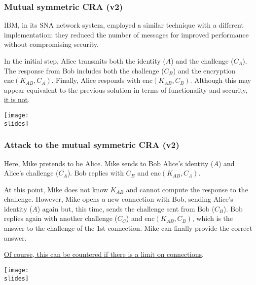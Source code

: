 \subsubsection{Mutual symmetric CRA (v2)}
\vspace*{5mm}
\noindent
\begin{minipage}{0.4\textwidth}
  IBM, in its SNA network system, employed a similar technique with a different implementation: they reduced the number of messages for improved performance without compromising security.

  In the initial step, Alice transmits both the identity (\(A\)) and the challenge (\(C_A\)). The response from Bob includes both the challenge (\(C_B\)) and the encryption \(\text{enc}(K_{AB}, C_A)\). Finally, Alice responds with \(\text{enc}(K_{AB}, C_B)\). Although this may appear equivalent to the previous solution in terms of functionality and security, \underline{it is not}.

\end{minipage}
\hspace{0.05\textwidth}
\begin{minipage}{0.5\textwidth}
  \centering
  \texttt{[image: \\slides]}
\end{minipage}




\subsubsection{Attack to the mutual symmetric CRA (v2)}
\vspace*{5mm}
\noindent
\begin{minipage}{0.4\textwidth}
  Here, Mike pretends to be Alice. Mike sends to Bob Alice's identity (\(A\)) and Alice's challenge (\(C_A\)). Bob replies with \(C_B\) and \(\text{enc}(K_{AB}, C_A)\).

  At this point, Mike does not know \(K_{AB}\) and cannot compute the response to the challenge. However, Mike opens a new connection with Bob, sending Alice's identity (\(A\)) again but, this time, sends the challenge sent from Bob (\(C_B\)). Bob replies again with another challenge (\(C_C\)) and \(\text{enc}(K_{AB}, C_B)\), which is the answer to the challenge of the 1st connection. Mike can finally provide the correct answer.

  \ul{Of course, this can be countered if there is a limit on connections}.
\end{minipage}
\hspace{0.05\textwidth}
\begin{minipage}{0.5\textwidth}
  \centering
  \texttt{[image: \\slides]}
\end{minipage}

